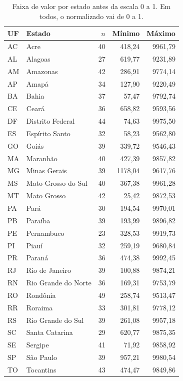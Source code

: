 \begin{table}[t]
    \centering
    \caption{Faixa de valor por estado antes da escala 0 a 1. Em todos, o normalizado vai de 0 a 1.}
    \label{tab:q6-estados}
    \footnotesize
    \setlength{\tabcolsep}{6pt}
    \begin{tabular}{@{}llrrr@{}}
        \toprule
        UF & Estado & \(n\) & Mínimo & Máximo \\
        \midrule
        AC & Acre                  & 40 &  418,24 & 9961,79 \\
        AL & Alagoas               & 27 &  619,77 & 9231,89 \\
        AM & Amazonas              & 42 &  286,91 & 9774,14 \\
        AP & Amapá                 & 34 &  127,90 & 9220,49 \\
        BA & Bahia                 & 37 &   57,47 & 9792,74 \\
        CE & Ceará                 & 36 &  658,82 & 9593,56 \\
        DF & Distrito Federal      & 44 &   74,63 & 9975,50 \\
        ES & Espírito Santo        & 32 &   58,23 & 9562,80 \\
        GO & Goiás                 & 39 &  339,72 & 9546,43 \\
        MA & Maranhão              & 40 &  427,39 & 9857,82 \\
        MG & Minas Gerais          & 39 & 1178,04 & 9617,76 \\
        MS & Mato Grosso do Sul    & 40 &  367,38 & 9961,28 \\
        MT & Mato Grosso           & 42 &   25,42 & 9872,53 \\
        PA & Pará                  & 30 &  194,54 & 9970,01 \\
        PB & Paraíba               & 39 &  193,99 & 9896,82 \\
        PE & Pernambuco            & 23 &  328,53 & 9919,73 \\
        PI & Piauí                 & 32 &  259,19 & 9680,84 \\
        PR & Paraná                & 36 &  474,38 & 9992,45 \\
        RJ & Rio de Janeiro        & 39 &  100,88 & 9874,21 \\
        RN & Rio Grande do Norte   & 36 &  169,31 & 9753,79 \\
        RO & Rondônia              & 49 &  258,74 & 9513,47 \\
        RR & Roraima               & 33 &  301,81 & 9778,12 \\
        RS & Rio Grande do Sul     & 39 &  261,08 & 9957,18 \\
        SC & Santa Catarina        & 29 &  620,77 & 9875,35 \\
        SE & Sergipe               & 41 &   71,92 & 9858,92 \\
        SP & São Paulo             & 39 &  957,21 & 9980,54 \\
        TO & Tocantins             & 43 &  474,47 & 9849,86 \\
        \bottomrule
    \end{tabular}
\end{table}
